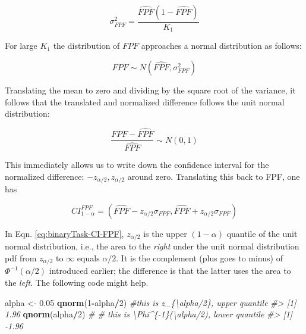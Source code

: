 \documentclass[
]{book}
\newenvironment{Shaded}{\begin{snugshade}}{\end{snugshade}}
\newcommand{\CommentTok}[1]{\textcolor[rgb]{0.56,0.35,0.01}{\textit{#1}}}
\newcommand{\DecValTok}[1]{\textcolor[rgb]{0.00,0.00,0.81}{#1}}
\newcommand{\FloatTok}[1]{\textcolor[rgb]{0.00,0.00,0.81}{#1}}
\newcommand{\KeywordTok}[1]{\textcolor[rgb]{0.13,0.29,0.53}{\textbf{#1}}}
\newcommand{\NormalTok}[1]{#1}
\newcommand{\OperatorTok}[1]{\textcolor[rgb]{0.81,0.36,0.00}{\textbf{#1}}}
\newcommand{\StringTok}[1]{\textcolor[rgb]{0.31,0.60,0.02}{#1}}
\begin{document}
\begin{equation} 
\sigma_{FPF}^2 = \frac{\widehat{FPF}\left ( 1 - \widehat{FPF} \right )}{K_1}
\label{eq:binaryTask-Var-FPF}
\end{equation}

For large \(K_1\) the distribution of \(FPF\) approaches a normal distribution as follows:

\[FPF \sim N\left ( \widehat{FPF}, \sigma_{FPF}^2 \right )\]

Translating the mean to zero and dividing by the square root of the variance, it follows that the translated and normalized difference follows the unit normal distribution:

\[\frac{FPF -  \widehat{FPF}}{\widehat{FPF}} \sim N\left ( 0, 1 \right )\]

This immediately allows us to write down the confidence interval for the normalized difference: \(-z_{\alpha/2}, z_{\alpha/2}\) around zero. Translating this back to FPF, one has

\begin{equation} 
CI_{1-\alpha}^{FPF}=\left ( \widehat{FPF} - z_{\alpha/2} \sigma_{FPF}, \widehat{FPF} + z_{\alpha/2} \sigma_{FPF} \right )
\label{eq:binaryTask-CI-FPF}
\end{equation}

In Eqn. \eqref{eq:binaryTask-CI-FPF}, \(z_{\alpha/2}\) is the upper \((1-\alpha)\) quantile of the unit normal distribution, i.e., the area to the \emph{right} under the unit normal distribution pdf from \(z_{\alpha/2}\) to \(\infty\) equals \(\alpha/2\). It is the complement (plus goes to minus) of \(\Phi^{-1}(\alpha/2)\) introduced earlier; the difference is that the latter uses the area to the \emph{left}. The following code might help.

\begin{Shaded}
\begin{Highlighting}[]
\NormalTok{alpha \textless{}{-}}\StringTok{ }\FloatTok{0.05}
\KeywordTok{qnorm}\NormalTok{(}\DecValTok{1}\OperatorTok{{-}}\NormalTok{alpha}\OperatorTok{/}\DecValTok{2}\NormalTok{) }\CommentTok{\#this is z\_\{\textbackslash{}alpha/2\}, upper quantile}
\CommentTok{\#\textgreater{} [1] 1.96}
\KeywordTok{qnorm}\NormalTok{(alpha}\OperatorTok{/}\DecValTok{2}\NormalTok{) }\CommentTok{\# \# this is \textbackslash{}Phi\^{}\{{-}1\}(\textbackslash{}alpha/2), lower quantile}
\CommentTok{\#\textgreater{} [1] {-}1.96}
\end{Highlighting}
\end{Shaded}
\end{document}
